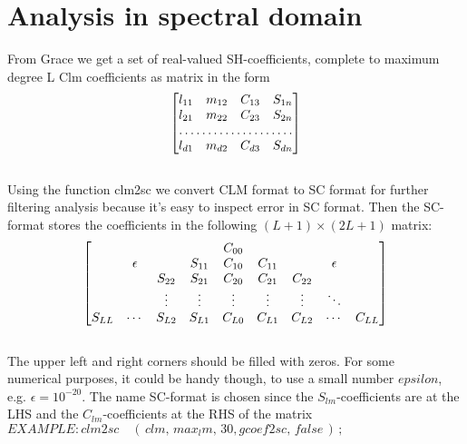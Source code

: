 \documentclass[a4paper,12pt]{article}
\begin{document}
\section{Analysis in spectral domain}
From Grace we get a set of real-valued SH-coefficients, complete to maximum degree L
Clm coefficients as matrix in the form\\
\[
\begin{bmatrix}
    l_{11}       & m_{12} & C_{13} & S_{1n} \\
    l_{21}       & m_{22} & C_{23} & S_{2n} \\
    \hdotsfor{4} \\
    l_{d1}       & m_{d2} & C_{d3} & S_{dn}
\end{bmatrix}
\]\\
Using the function clm2sc we convert CLM format to SC format for further filtering analysis because it's easy to inspect error in SC format.
Then the SC-format stores the coefficients in the following $(L + 1)\times (2L + 1)$ matrix:\\

\[
\centering%
\begin{bmatrix}%
      &         &         &         & C_{00}   &         &         &             & \\
      & \epsilon&         & S_{11}  & C_{10}   &C_{11}   &         & \epsilon    & \\
      &         & S_{22}  & S_{21}  & C_{20}   & C_{21}  & C_{22}  &             & \\
      &         &\vdots{} &\vdots{} & \vdots{} &\vdots{} &\vdots{} &\ddots       & \\
      S_{LL}    &\cdots   & S_{L2}  & S_{L1}   & C_{L0}  & C_{L1}  & C_{L2}      &\cdots &C_{LL}
\end{bmatrix}%
\]\\
The upper left and right corners should be filled with zeros. For some \\ numerical purposes,
it could be handy though, to use a small number $epsilon$, e.g. $\epsilon = 10^{-20}$.
The name SC-format is chosen since the $S_{lm}$-coefficients are at the LHS and the $C_{lm}$-coefficients at the RHS of the matrix\\
$EXAMPLE: clm2sc\quad(\,clm,\, max_lm,\, 30, gcoef2sc,\, false\,)\,;$
\end{document}
